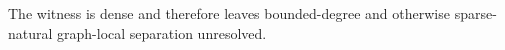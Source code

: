 The witness is dense and therefore leaves bounded-degree and otherwise sparse-natural graph-local separation unresolved.
